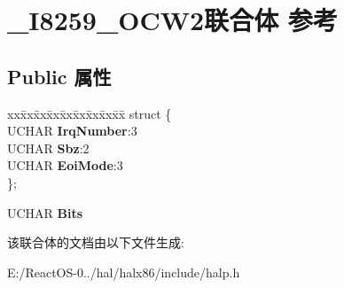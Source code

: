 \hypertarget{union___i8259___o_c_w2}{}\section{\+\_\+\+I8259\+\_\+\+O\+C\+W2联合体 参考}
\label{union___i8259___o_c_w2}
\subsection*{Public 属性}
\begin{DoxyCompactItemize}
\item 
\mbox{\label{union___i8259___o_c_w2_a9428c139a45a438e0d17e89db53c8a89}} 
\begin{tabbing}
xx\=xx\=xx\=xx\=xx\=xx\=xx\=xx\=xx\=\kill
struct \{\\
\>UCHAR {\bfseries IrqNumber}:3\\
\>UCHAR {\bfseries Sbz}:2\\
\>UCHAR {\bfseries EoiMode}:3\\
\}; \\

\end{tabbing}\item 
\mbox{\label{union___i8259___o_c_w2_a2ec8881f39eb1eb1f7858a5a131d7c32}} 
U\+C\+H\+AR {\bfseries Bits}
\end{DoxyCompactItemize}


该联合体的文档由以下文件生成\+:\begin{DoxyCompactItemize}
\item 
E\+:/\+React\+O\+S-\/0../hal/halx86/include/halp.\+h\end{DoxyCompactItemize}

